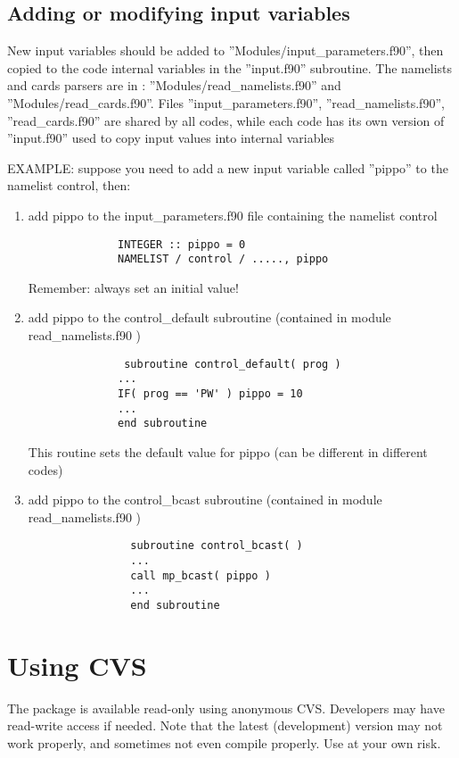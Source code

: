 \documentclass[12pt,a4paper]{article}
\begin{document}
\subsection{Adding or modifying input variables}

New input variables should be added to 
''Modules/input\_parameters.f90'',
then copied to the code internal variables in the ''input.f90''
subroutine. The namelists and cards parsers are in :
''Modules/read\_namelists.f90'' and ''Modules/read\_cards.f90''.
Files ''input\_parameters.f90'', ''read\_namelists.f90'',
''read\_cards.f90'' are shared by all codes, while each code
has its own version of ''input.f90''  used to copy input values
into internal variables

EXAMPLE:
suppose you need to add a new input variable called ''pippo''
to the namelist control, then:

\begin{enumerate}
\item add pippo to the input\_parameters.f90 file containing the
namelist control 
\begin{verbatim}
              INTEGER :: pippo = 0
              NAMELIST / control / ....., pippo
\end{verbatim}
Remember: always set an initial value!

\item add pippo to the control\_default subroutine (contained in
module read\_namelists.f90 ) 
\begin{verbatim}
               subroutine control_default( prog )
              ...
              IF( prog == 'PW' ) pippo = 10
              ...
              end subroutine
\end{verbatim}
This routine sets the default value for pippo (can be different in
different codes) 

\item add pippo to the control\_bcast subroutine (contained in module
read\_namelists.f90 ) 
 \begin{verbatim}
                subroutine control_bcast( )
                ...
                call mp_bcast( pippo )
                ...
                end subroutine
\end{verbatim}
\end{enumerate}
 
\section{ Using CVS}
\label{Sec:CVS}
The package is available read-only using anonymous CVS. Developers may
have read-write access if needed. Note that the latest (development)
version may not work properly, and sometimes not even compile
properly. Use at your own risk. 
\end{document}
